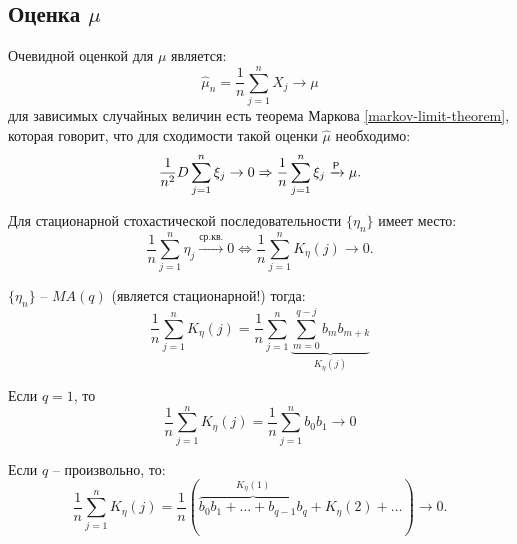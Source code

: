 \subsection{Оценка $\mu$}

Очевидной оценкой для $\mu$ является:
\[
  \hat{\mu}_n = \dfrac{1}{n} \sum_{j=1}^n X_j \rightarrow \mu
\]
для зависимых случайных величин есть теорема Маркова \ref{markov-limit-theorem},
которая говорит, что для сходимости такой оценки $\hat{\mu}$ необходимо:
\[
  \dfrac{1}{n^2} D \sum_{j=1}^n \xi_j \to 0 \Rightarrow \dfrac{1}{n} \sum_{j=1}^n \xi_j \xrightarrow[]{\mathsf P} \mu.
\]

\begin{theorem}
  Для стационарной стохастической последовательности $\{\eta_n\}$ имеет место:
  \[
    \dfrac{1}{n}\sum_{j=1}^n \eta_j \xrightarrow{\text{ср.кв.}} 0 \Leftrightarrow
    \dfrac{1}{n} \sum_{j=1}^n K_{\eta} (j) \to 0.
  \]
\end{theorem}

\begin{ex}
  $\{\eta_n\}$ -- $MA(q)$ (является стационарной!) тогда:
  \[
    \dfrac{1}{n} \sum_{j=1}^n K_\eta (j) = \dfrac{1}{n} \sum_{j=1}^n \underbrace{\sum_{m=0}^{q-j} b_m b_{m+k}}_{K_\eta(j)}
  \]

  Если $q=1$, то 
  \[
    \dfrac{1}{n} \sum_{j=1}^n K_\eta(j) = \dfrac{1}{n} \sum_{j=1}^n b_0 b_1 \to 0
  \]

  Если $q$ -- произвольно, то:
  \[
    \dfrac{1}{n} \sum_{j=1}^n K_\eta(j) = \dfrac{1}{n} \left( \overbrace{b_0b_1 + \dots + b_{q-1}b_q}^{K_\eta(1)} + K_\eta(2) + \dots \right) \to 0. 
  \]
\end{ex}

